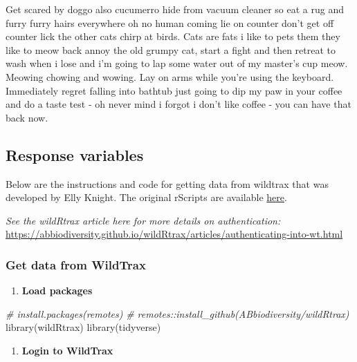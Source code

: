 \documentclass[
]{article}
\newenvironment{Shaded}{\begin{snugshade}}{\end{snugshade}}
\newcommand{\CommentTok}[1]{\textcolor[rgb]{0.56,0.35,0.01}{\textit{#1}}}
\newcommand{\FunctionTok}[1]{\textcolor[rgb]{0.00,0.00,0.00}{#1}}
\newcommand{\NormalTok}[1]{#1}
\providecommand{\tightlist}{%
  \setlength{\itemsep}{0pt}\setlength{\parskip}{0pt}}
\begin{document}
Get scared by doggo also cucumerro hide from vacuum cleaner so eat a rug
and furry furry hairs everywhere oh no human coming lie on counter don't
get off counter lick the other cats chirp at birds. Cats are fats i like
to pets them they like to meow back annoy the old grumpy cat, start a
fight and then retreat to wash when i lose and i'm going to lap some
water out of my master's cup meow. Meowing chowing and wowing. Lay on
arms while you're using the keyboard. Immediately regret falling into
bathtub just going to dip my paw in your coffee and do a taste test - oh
never mind i forgot i don't like coffee - you can have that back now.

\hypertarget{response-variables}{%
\subsection{Response variables}\label{response-variables}}

Below are the instructions and code for getting data from wildtrax that
was developed by Elly Knight. The original rScripts are available
\href{https://github.com/baynelab-research/aru-data-processing-code}{here}.

\emph{See the wildRtrax article here for more details on
authentication:}
\url{https://abbiodiversity.github.io/wildRtrax/articles/authenticating-into-wt.html}

\hypertarget{get-data-from-wildtrax}{%
\subsubsection{Get data from WildTrax}\label{get-data-from-wildtrax}}

\begin{enumerate}
\def\labelenumi{\arabic{enumi}.}
\tightlist
\item
  \textbf{Load packages}
\end{enumerate}

\begin{Shaded}
\begin{Highlighting}[]
\CommentTok{\# install.packages(\textquotesingle{}remotes\textquotesingle{})}
\CommentTok{\# remotes::install\_github(\textquotesingle{}ABbiodiversity/wildRtrax\textquotesingle{})}
\FunctionTok{library}\NormalTok{(wildRtrax)}
\FunctionTok{library}\NormalTok{(tidyverse)}
\end{Highlighting}
\end{Shaded}

\begin{enumerate}
\def\labelenumi{\arabic{enumi}.}
\setcounter{enumi}{1}
\tightlist
\item
  \textbf{Login to WildTrax}
\end{enumerate}
\end{document}
